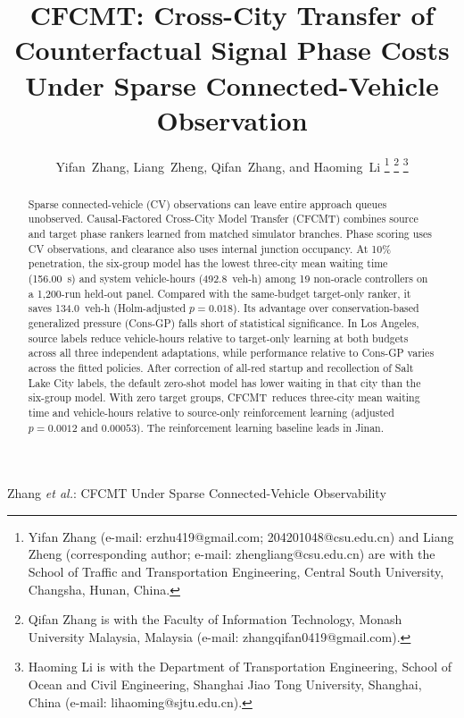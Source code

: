 \documentclass[letterpaper,journal]{IEEEtran}
\newcommand{\method}{CFCMT}
\begin{document}
\title{CFCMT: Cross-City Transfer of Counterfactual Signal Phase Costs Under Sparse Connected-Vehicle Observation}

\author{Yifan~Zhang, Liang~Zheng, Qifan~Zhang, and Haoming~Li%
\thanks{Yifan Zhang (e-mail: erzhu419@gmail.com; 204201048@csu.edu.cn) and Liang Zheng (corresponding author; e-mail: zhengliang@csu.edu.cn) are with the School of Traffic and Transportation Engineering, Central South University, Changsha, Hunan, China.}%
\thanks{Qifan Zhang is with the Faculty of Information Technology, Monash University Malaysia, Malaysia (e-mail: zhangqifan0419@gmail.com).}%
\thanks{Haoming Li is with the Department of Transportation Engineering, School of Ocean and Civil Engineering, Shanghai Jiao Tong University, Shanghai, China (e-mail: lihaoming@sjtu.edu.cn).}}

%
{Zhang \MakeLowercase{\textit{et al.}}: CFCMT Under Sparse Connected-Vehicle Observability}

\maketitle

\begin{abstract}
Sparse connected-vehicle (CV) observations can leave entire approach queues unobserved. Causal-Factored Cross-City Model Transfer (\method) combines source and target phase rankers learned from matched simulator branches. Phase scoring uses CV observations, and clearance also uses internal junction occupancy. At 10\% penetration, the six-group model has the lowest three-city mean waiting time (156.00~s) and system vehicle-hours (492.8~veh-h) among 19 non-oracle controllers on a 1,200-run held-out panel. Compared with the same-budget target-only ranker, it saves 134.0~veh-h (Holm-adjusted $p=0.018$). Its advantage over conservation-based generalized pressure (Cons-GP) falls short of statistical significance. In Los Angeles, source labels reduce vehicle-hours relative to target-only learning at both budgets across all three independent adaptations, while performance relative to Cons-GP varies across the fitted policies. After correction of all-red startup and recollection of Salt Lake City labels, the default zero-shot model has lower waiting in that city than the six-group model. With zero target groups, \method\ reduces three-city mean waiting time and vehicle-hours relative to source-only reinforcement learning (adjusted $p=0.0012$ and $0.00053$). The reinforcement learning baseline leads in Jinan.

\end{abstract}
\end{document}
